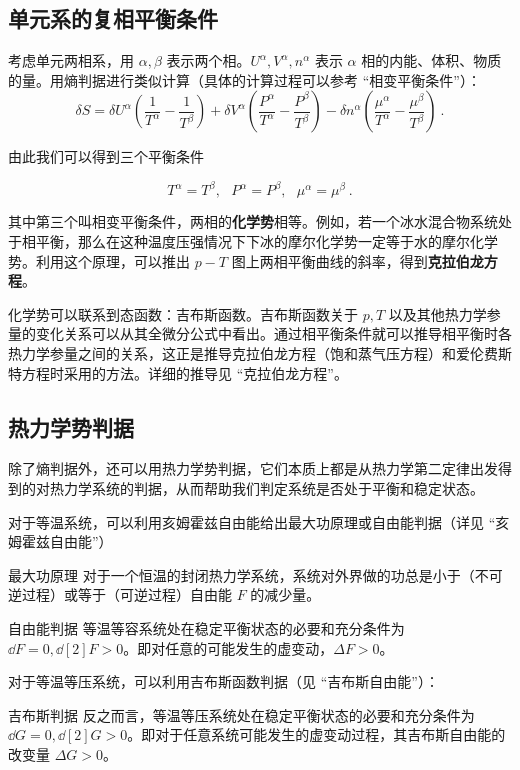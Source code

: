 \subsection{单元系的复相平衡条件}
考虑单元两相系，用 $\alpha,\beta$ 表示两个相。$U^\alpha,V^\alpha,n^\alpha$ 表示 $\alpha$ 相的内能、体积、物质的量。用熵判据进行类似计算（具体的计算过程可以参考 “相变平衡条件”）：
\begin{equation}
\delta S=\delta U^\alpha\left(\frac{1}{T^\alpha}-\frac{1}{T^\beta}\right)+\delta V^\alpha\left(\frac{P^\alpha}{T^\alpha}-\frac{P^\beta}{T^\beta}\right)
-\delta n^\alpha\left(\frac{\mu^\alpha}{T^\alpha}-\frac{\mu^\beta}{T^\beta}\right)~.
\end{equation}

由此我们可以得到三个平衡条件

\begin{equation}
T^\alpha=T^\beta,\ \ \ P^\alpha=P^\beta,\ \ \ \mu^\alpha=\mu^\beta~.
\end{equation}

其中第三个叫相变平衡条件，两相的\textbf{化学势}相等。例如，若一个冰水混合物系统处于相平衡，那么在这种温度压强情况下下冰的摩尔化学势一定等于水的摩尔化学势。利用这个原理，可以推出 $p-T$ 图上两相平衡曲线的斜率，得到\textbf{克拉伯龙方程}。

化学势可以联系到态函数：吉布斯函数。吉布斯函数关于 $p,T$ 以及其他热力学参量的变化关系可以从其全微分公式中看出。通过相平衡条件就可以推导相平衡时各热力学参量之间的关系，这正是推导克拉伯龙方程（饱和蒸气压方程）和爱伦费斯特方程时采用的方法。详细的推导见 “克拉伯龙方程”。

\subsection{热力学势判据}
除了熵判据外，还可以用热力学势判据，它们本质上都是从热力学第二定律出发得到的对热力学系统的判据，从而帮助我们判定系统是否处于平衡和稳定状态。

对于等温系统，可以利用亥姆霍兹自由能给出最大功原理或自由能判据（详见 “亥姆霍兹自由能”）
\begin{theorem}{最大功原理}
对于一个恒温的封闭热力学系统，系统对外界做的功总是小于（不可逆过程）或等于（可逆过程）自由能 $F$ 的减少量。
\end{theorem}
\begin{theorem}{自由能判据}
等温等容系统处在稳定平衡状态的必要和充分条件为 $\dd F=0,\dd[2]{F}>0$。即对任意的可能发生的虚变动，$\Delta F>0$。
\end{theorem}

对于等温等压系统，可以利用吉布斯函数判据（见 “吉布斯自由能”）：
\begin{theorem}{吉布斯判据}
反之而言，等温等压系统处在稳定平衡状态的必要和充分条件为 
$\dd G=0, \dd[2]{G}>0$。即对于任意系统可能发生的虚变动过程，其吉布斯自由能的改变量 $\Delta G>0$。
\end{theorem}
